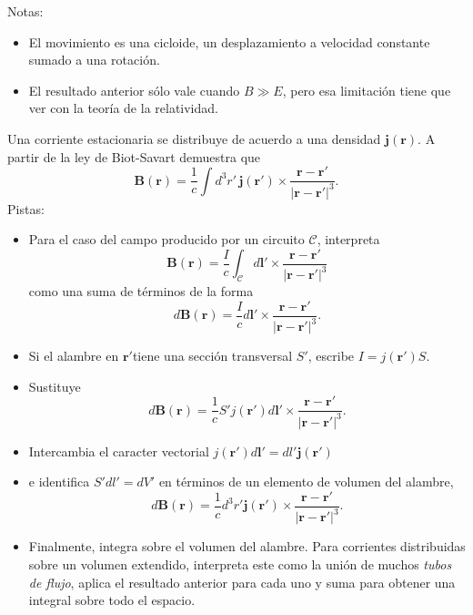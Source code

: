 \documentclass{exam}
\begin{document}
\begin{questions}
    Notas:
    \begin{itemize}
    \item El movimiento es una cicloide, un desplazamiento a velocidad
      constante sumado a una rotación.
    \item El resultado anterior sólo vale cuando $B\gg E$, pero esa
      limitación tiene que ver con la teoría de la relatividad.
    \end{itemize}
  \question Una corriente estacionaria se distribuye de acuerdo a una
    densidad $\bm j(\bm r)$. A partir de la ley de Biot-Savart
    demuestra que
    $$
    \bm B(\bm r)=\frac{1}{c}\int d^3r'\,\bm j(\bm r')\times\frac{\bm
      r-\bm r'}{|\bm r-\bm r'|^3}.
    $$
    Pistas:
    \begin{itemize}
    \item Para el caso del campo producido por un circuito $\mathcal C$, interpreta
      $$
      \bm B(\bm r)=\frac{I}{c}\int_{\mathcal C}d\bm l'\times \frac{\bm
        r-\bm r'}{|\bm r-\bm r'|^3}
      $$
      como una suma de términos de la forma
      $$
      d \bm B(\bm r)=\frac{I}{c} d\bm l'\times \frac{\bm
        r-\bm r'}{|\bm r-\bm r'|^3}.
      $$
    \item Si el alambre en $\bm r'$tiene una sección transversal $S'$, escribe
      $I=j(\bm r')S$.
    \item Sustituye
      $$
      d \bm B(\bm r)=\frac{1}{c} S' j(\bm r') d\bm l'\times \frac{\bm
        r-\bm r'}{|\bm r-\bm r'|^3}.
      $$
    \item Intercambia el caracter vectorial $j(\bm r') d\bm l'=dl'\bm j(\bm r')$
    \item e identifica $S' dl'=dV'$ en términos de un elemento de
      volumen del alambre,
      $$
      d \bm B(\bm r)=\frac{1}{c} d^3r' \bm j(\bm r') \times \frac{\bm
        r-\bm r'}{|\bm r-\bm r'|^3}.
      $$
    \item Finalmente, integra sobre el volumen del alambre. Para
      corrientes distribuidas sobre un volumen extendido, interpreta
      este como la unión de muchos {\em tubos de flujo}, aplica el
      resultado anterior para cada uno y suma para obtener una
      integral sobre todo el espacio.
    \end{itemize}

\end{questions}
\end{document}

